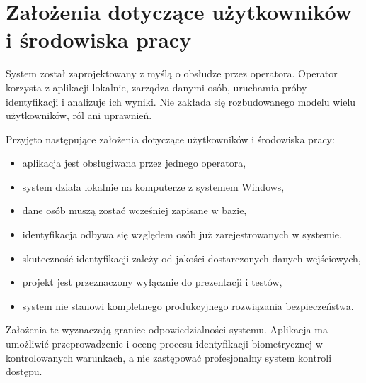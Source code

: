\newpage

\section{Założenia dotyczące użytkowników i środowiska pracy}

System został zaprojektowany z myślą o obsłudze przez operatora. Operator korzysta z aplikacji lokalnie, zarządza danymi osób, uruchamia próby identyfikacji i analizuje ich wyniki. Nie zakłada się rozbudowanego modelu wielu użytkowników, ról ani uprawnień.

Przyjęto następujące założenia dotyczące użytkowników i środowiska pracy:
\begin{itemize}
    \item aplikacja jest obsługiwana przez jednego operatora,
    \item system działa lokalnie na komputerze z systemem Windows,
    \item dane osób muszą zostać wcześniej zapisane w bazie,
    \item identyfikacja odbywa się względem osób już zarejestrowanych w systemie,
    \item skuteczność identyfikacji zależy od jakości dostarczonych danych wejściowych,
    \item projekt jest przeznaczony wyłącznie do prezentacji i testów,
    \item system nie stanowi kompletnego produkcyjnego rozwiązania bezpieczeństwa.
\end{itemize}

Założenia te wyznaczają granice odpowiedzialności systemu. Aplikacja ma umożliwić przeprowadzenie i ocenę procesu identyfikacji biometrycznej w kontrolowanych warunkach, a nie zastępować profesjonalny system kontroli dostępu.